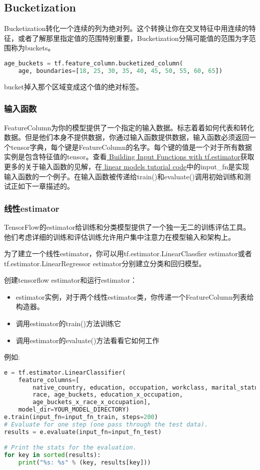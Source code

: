 \subsection{Bucketization}
Bucketization转化一个连续的列为绝对列。这个转换让你在交叉特征中用连续的特征，或者了解那里指定值的范围特别重要，Bucketization分隔可能值的范围为字范围称为buckets。
\begin{lstlisting}[language=Python]
age_buckets = tf.feature_column.bucketized_column(
    age, boundaries=[18, 25, 30, 35, 40, 45, 50, 55, 60, 65])
\end{lstlisting}
bucket掉入那个区域变成这个值的绝对标签。

\subsubsection{输入函数}
FeatureColumn为你的模型提供了一个指定的输入数据。标志着着如何代表和转化数据。但是他们本身不提供数据，你通过输入函数提供数据，输入函数必须返回一个tensor字典，每个键是FeatureColumn的名字。每个键的值是一个对于所有数据实例是包含特征值的tensor。查看\href{https://www.tensorflow.org/get_started/input_fn}{ Building Input Functions with tf.estimator}获取更多的关于输入函数的见解，在\href{https://www.github.com/tensorflow/tensorflow/blob/r1.3/tensorflow/examples/learn/wide_n_deep_tutorial.py}{ linear models tutorial code}中的input\_fn是实现输入函数的一个例子。在输入函数被传递给train()和evaluate()调用初始训练和测试正如下一章描述的。
\subsubsection{线性estimator}
TensorFlow的estimator给训练和分类模型提供了一个独一无二的训练评估工具。他们考虑详细的训练和评估训练允许用户集中注意力在模型输入和架构上。

为了建立一个线性estimator，你可以用tf.estimator.LinearClassfier estimator或者tf.estimator.LinearRegressor estimator分别建立分类和回归模型。

创建tensorflow estimator和运行estimator：
\begin{itemize}
  \item estimator实例，对于两个线性estimator类，你传递一个FeatureColumn列表给构造器。
  \item 调用estimator的train()方法训练它
  \item 调用estimator的evaluate()方法看看它如何工作
\end{itemize}
例如:
\begin{lstlisting}[language=Python]
e = tf.estimator.LinearClassifier(
    feature_columns=[
        native_country, education, occupation, workclass, marital_status,
        race, age_buckets, education_x_occupation,
        age_buckets_x_race_x_occupation],
    model_dir=YOUR_MODEL_DIRECTORY)
e.train(input_fn=input_fn_train, steps=200)
# Evaluate for one step (one pass through the test data).
results = e.evaluate(input_fn=input_fn_test)

# Print the stats for the evaluation.
for key in sorted(results):
    print("%s: %s" % (key, results[key]))
\end{lstlisting}
